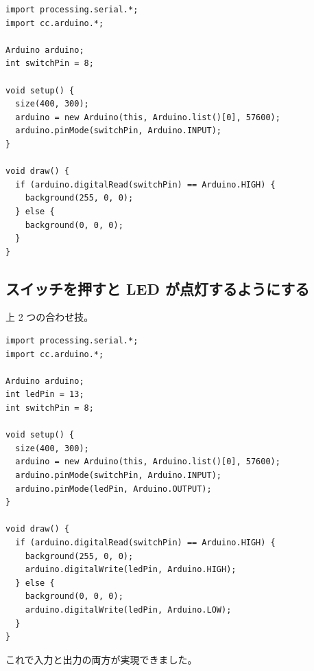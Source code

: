 \documentclass[11pt,a4paper]{jarticle}
\begin{document}
\begin{lstlisting}
import processing.serial.*;
import cc.arduino.*;

Arduino arduino;
int switchPin = 8;
 
void setup() {
  size(400, 300);
  arduino = new Arduino(this, Arduino.list()[0], 57600);
  arduino.pinMode(switchPin, Arduino.INPUT);  
}
 
void draw() {
  if (arduino.digitalRead(switchPin) == Arduino.HIGH) {
    background(255, 0, 0);
  } else {
    background(0, 0, 0);
  }
}
\end{lstlisting}



\subsection*{スイッチを押すと LED が点灯するようにする}
上 2 つの合わせ技。

\begin{lstlisting}
import processing.serial.*;
import cc.arduino.*;

Arduino arduino;
int ledPin = 13;
int switchPin = 8;
 
void setup() {
  size(400, 300);
  arduino = new Arduino(this, Arduino.list()[0], 57600);
  arduino.pinMode(switchPin, Arduino.INPUT);
  arduino.pinMode(ledPin, Arduino.OUTPUT);
}
 
void draw() {
  if (arduino.digitalRead(switchPin) == Arduino.HIGH) {
    background(255, 0, 0);
    arduino.digitalWrite(ledPin, Arduino.HIGH);
  } else {
    background(0, 0, 0);
    arduino.digitalWrite(ledPin, Arduino.LOW);
  }
}
\end{lstlisting}

これで入力と出力の両方が実現できました。
\end{document}
